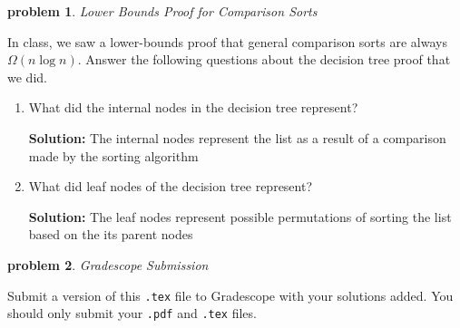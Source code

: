 \documentclass[10pt]{article}
\newtheorem{problem}{\sc\color{cit}problem}
\begin{document}
\begin{problem} Lower Bounds Proof for Comparison Sorts \end{problem}

In class, we saw a lower-bounds proof that general comparison sorts are always $\Omega(n \log n)$. Answer the following questions about the decision tree proof that we did.
    \begin{enumerate}   
    	\item What did the internal nodes in the decision tree represent?

        \textbf{Solution:}  The internal nodes represent the list as a result of a comparison made by the sorting algorithm

        \item What did leaf nodes of the decision tree represent?
        
        \textbf{Solution:}  The leaf nodes represent possible permutations of sorting the list based on the its parent nodes
        
    \end{enumerate}

\begin{problem} Gradescope Submission \end{problem}
Submit a version of this \verb|.tex| file to Gradescope with your solutions added.  You should only submit your \verb|.pdf| and \verb|.tex| files.

%
%
\end{document}
